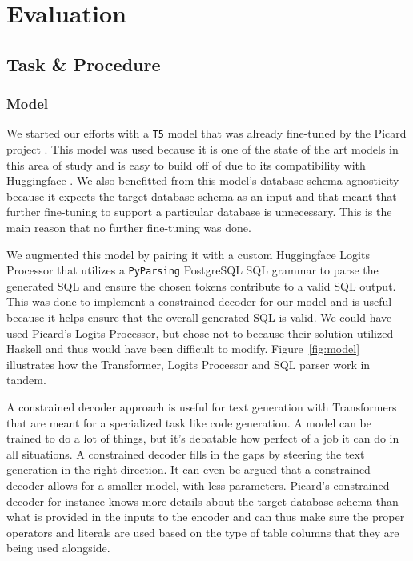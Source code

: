 \documentclass[11pt]{article}
\begin{document}
\section{Evaluation} \label{sec:eval}


\subsection{Task \& Procedure}

\subsubsection{Model}

We started our efforts with a \texttt{T5} model that was already fine-tuned by the Picard project \citep{scholak2021picard}. This model was used because it is one of the state of the art models in this area of study and is easy to build off of due to its compatibility with Huggingface \citep{wolf2020huggingfaces}. We also benefitted from this model's database schema agnosticity because it expects the target database schema as an input and that meant that further fine-tuning to support a particular database is unnecessary. This is the main reason that no further fine-tuning was done.

We augmented this model by pairing it with a custom Huggingface Logits Processor that utilizes a \texttt{PyParsing} PostgreSQL SQL grammar \citep{githubPyparsing} to parse the generated SQL and ensure the chosen tokens contribute to a valid SQL output. This was done to implement a constrained decoder for our model and is useful because it helps ensure that the overall generated SQL is valid. We could have used Picard's Logits Processor, but chose not to because their solution utilized Haskell and thus would have been difficult to modify. Figure~\ref{fig:model} illustrates how the Transformer, Logits Processor and SQL parser work in tandem.

A constrained decoder approach is useful for text generation with Transformers that are meant for a specialized task like code generation. A model can be trained to do a lot of things, but it's debatable how perfect of a job it can do in all situations. A constrained decoder fills in the gaps by steering the text generation in the right direction. It can even be argued that a constrained decoder allows for a smaller model, with less parameters. Picard's constrained decoder for instance knows more details about the target database schema than what is provided in the inputs to the encoder and can thus make sure the proper operators and literals are used based on the type of table columns that they are being used alongside.
\end{document}
